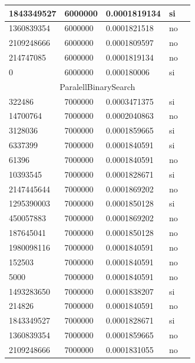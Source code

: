 \documentclass[12pt, fleqn]{article}                             %
\theoremstyle{break}                                            %
\begin{document}
\begin{longtable}{|m{5em}|m{5em}|m{10em}|m{5em}|@{}m{0pt}@{}}
            1843349527& 6000000  & 0.0001819134 & si &\\[1em]    \hline
            1360839354& 6000000  & 0.0001821518 & no &\\[1em]    \hline
            2109248666& 6000000  & 0.0001809597 & no &\\[1em]    \hline
            214747085& 6000000  & 0.0001819134 & no &\\[1em]    \hline
            0& 6000000  & 0.000180006 & si &\\[1em]    \hline
            \multicolumn{5}{|c|}{ParalellBinarySearch}   \\          \hline
            322486& 7000000  & 0.0003471375 & si &\\[1em]    \hline
            14700764& 7000000  & 0.0002040863 & no &\\[1em]    \hline
            3128036& 7000000  & 0.0001859665 & si &\\[1em]    \hline
            6337399& 7000000  & 0.0001840591 & si &\\[1em]    \hline
            61396& 7000000  & 0.0001840591 & no &\\[1em]    \hline
            10393545& 7000000  & 0.0001828671 & si &\\[1em]    \hline
            2147445644& 7000000  & 0.0001869202 & no &\\[1em]    \hline
            1295390003& 7000000  & 0.0001850128 & si &\\[1em]    \hline
            450057883& 7000000  & 0.0001869202 & no &\\[1em]    \hline
            187645041& 7000000  & 0.0001850128 & no &\\[1em]    \hline
            1980098116& 7000000  & 0.0001840591 & no &\\[1em]    \hline
            152503& 7000000  & 0.0001840591 & no &\\[1em]    \hline
            5000& 7000000  & 0.0001840591 & no &\\[1em]    \hline
            1493283650& 7000000  & 0.0001838207 & si &\\[1em]    \hline
            214826& 7000000  & 0.0001840591 & no &\\[1em]    \hline
            1843349527& 7000000  & 0.0001828671 & si &\\[1em]    \hline
            1360839354& 7000000  & 0.0001859665 & no &\\[1em]    \hline
            2109248666& 7000000  & 0.0001831055 & no &\\[1em]    \hline

\end{longtable}
\end{document}
